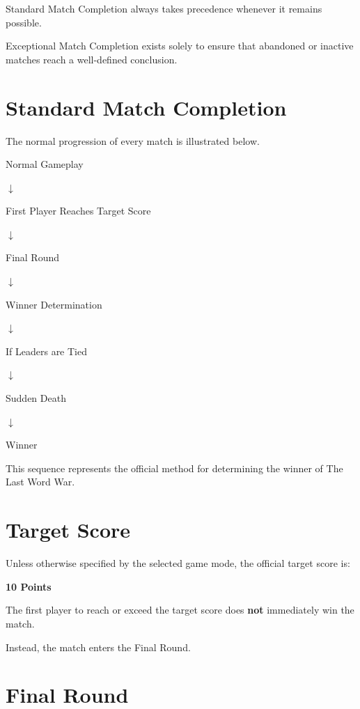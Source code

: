 \documentclass[11pt,a4paper]{article}
\begin{document}
Standard Match Completion always takes precedence whenever it remains possible.

Exceptional Match Completion exists solely to ensure that abandoned or inactive matches reach a well-defined conclusion.

\section{Standard Match Completion}

The normal progression of every match is illustrated below.

\begin{center}
Normal Gameplay

$\downarrow$

First Player Reaches Target Score

$\downarrow$

Final Round

$\downarrow$

Winner Determination

$\downarrow$

If Leaders are Tied

$\downarrow$

Sudden Death

$\downarrow$

Winner
\end{center}

This sequence represents the official method for determining the winner of The Last Word War\texttrademark.

\section{Target Score}

Unless otherwise specified by the selected game mode, the official target score is:

\begin{center}
\Large\textbf{10 Points}
\end{center}

The first player to reach or exceed the target score does \textbf{not} immediately win the match.

Instead, the match enters the Final Round.

\section{Final Round}
\end{document}
